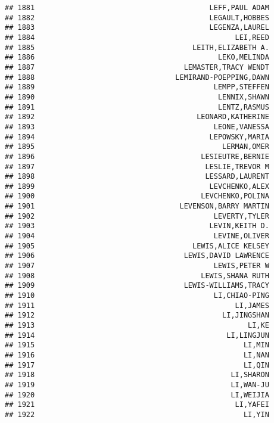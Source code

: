 \documentclass[
]{article}
\begin{document}
\begin{verbatim}
## 1881                                         LEFF,PAUL ADAM
## 1882                                         LEGAULT,HOBBES
## 1883                                         LEGENZA,LAUREL
## 1884                                               LEI,REED
## 1885                                     LEITH,ELIZABETH A.
## 1886                                           LEKO,MELINDA
## 1887                                   LEMASTER,TRACY WENDT
## 1888                                 LEMIRAND-POEPPING,DAWN
## 1889                                          LEMPP,STEFFEN
## 1890                                           LENNIX,SHAWN
## 1891                                           LENTZ,RASMUS
## 1892                                      LEONARD,KATHERINE
## 1893                                          LEONE,VANESSA
## 1894                                         LEPOWSKY,MARIA
## 1895                                            LERMAN,OMER
## 1896                                       LESIEUTRE,BERNIE
## 1897                                        LESLIE,TREVOR M
## 1898                                        LESSARD,LAURENT
## 1899                                         LEVCHENKO,ALEX
## 1900                                       LEVCHENKO,POLINA
## 1901                                  LEVENSON,BARRY MARTIN
## 1902                                          LEVERTY,TYLER
## 1903                                         LEVIN,KEITH D.
## 1904                                          LEVINE,OLIVER
## 1905                                     LEWIS,ALICE KELSEY
## 1906                                   LEWIS,DAVID LAWRENCE
## 1907                                          LEWIS,PETER W
## 1908                                       LEWIS,SHANA RUTH
## 1909                                   LEWIS-WILLIAMS,TRACY
## 1910                                          LI,CHIAO-PING
## 1911                                               LI,JAMES
## 1912                                            LI,JINGSHAN
## 1913                                                  LI,KE
## 1914                                             LI,LINGJUN
## 1915                                                 LI,MIN
## 1916                                                 LI,NAN
## 1917                                                 LI,QIN
## 1918                                              LI,SHARON
## 1919                                              LI,WAN-JU
## 1920                                              LI,WEIJIA
## 1921                                               LI,YAFEI
## 1922                                                 LI,YIN

\end{verbatim}
\end{document}
